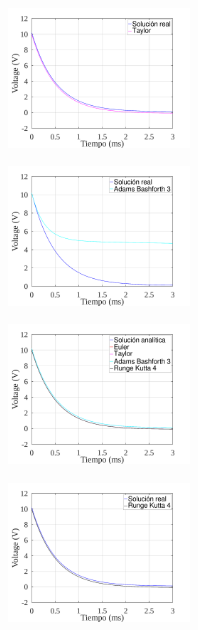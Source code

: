 \documentclass[letterpaper, 10 pt, conference]{ieeeconf}  %
\begin{document}
\begin{figure}[H]
\centering
\includegraphics[width=0.43\textwidth]{../plots/ej4/ej4-metodos-4.png}
\end{figure}

\begin{figure}[H]
\centering
\includegraphics[width=0.43\textwidth]{../plots/ej4/ej4-metodos-5.png}
\end{figure}

\begin{figure}[H]
\centering
\includegraphics[width=0.43\textwidth]{../plots/ej4/ej4-metodos-2.png}
\end{figure}

\begin{figure}[H]
\centering
\includegraphics[width=0.43\textwidth]{../plots/ej4/ej4-metodos-6.png}
\end{figure}
\end{document}
